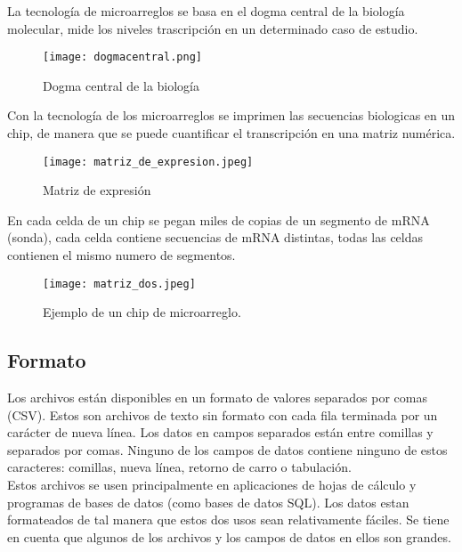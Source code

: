 \documentclass[12pt,letterpaper]{article}
\begin{document}
La tecnología de microarreglos se basa en el dogma central de la biología molecular, mide los niveles trascripción en un determinado caso de estudio.

\begin{figure}[H]
\begin{center}
\texttt{[image: dogmacentral.png]}
\end{center}
\caption{Dogma central de la biología}
\label{dogma}
\end{figure}

Con la tecnología de los microarreglos se imprimen las secuencias biologicas en un chip, de manera que se puede cuantificar el transcripción en una matriz numérica.	
\begin{figure}[H]
\begin{center}
\texttt{[image: matriz\_de\_expresion.jpeg]}
\end{center}
\caption{Matriz de expresión}
\end{figure}

En cada celda de un chip se pegan miles de copias de un segmento de mRNA (sonda), cada celda contiene secuencias de mRNA distintas, todas las celdas contienen el mismo numero de segmentos.

\begin{figure}[H]
\begin{center}
\texttt{[image: matriz\_dos.jpeg]}
\end{center}
\caption{Ejemplo de un chip de microarreglo.}
\end{figure}

\subsection{Formato}
Los archivos están disponibles en un formato de valores separados por comas (CSV). Estos son archivos de texto sin formato con cada fila terminada por un carácter de nueva línea. Los datos en campos separados están entre comillas y separados por comas. Ninguno de los campos de datos contiene ninguno de estos caracteres: comillas, nueva línea, retorno de carro o tabulación.\\

Estos archivos se usen principalmente en aplicaciones de hojas de cálculo y programas de bases de datos (como bases de datos SQL). Los datos estan formateados de tal manera que estos dos usos sean relativamente fáciles. Se tiene en cuenta que algunos de los archivos y los campos de datos en ellos son grandes. 
\end{document}
